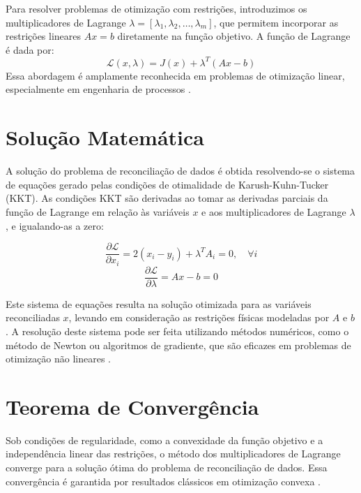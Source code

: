 \begin{definicao}
Para resolver problemas de otimização com restrições, introduzimos os multiplicadores de Lagrange $\lambda = [\lambda_1, \lambda_2, \dots, \lambda_m]$, que permitem incorporar as restrições lineares $Ax = b$ diretamente na função objetivo. A função de Lagrange é dada por:
\[
\mathcal{L}(x, \lambda) = J(x) + \lambda^T(Ax - b)
\]
Essa abordagem é amplamente reconhecida em problemas de otimização linear, especialmente em engenharia de processos \cite{lagrangerecon}.
\end{definicao}

\section{Solução Matemática}
\label{Sec:SolucaoMatematica}

A solução do problema de reconciliação de dados é obtida resolvendo-se o sistema de equações gerado pelas condições de otimalidade de Karush-Kuhn-Tucker (KKT). As condições KKT são derivadas ao tomar as derivadas parciais da função de Lagrange em relação às variáveis $x$ e aos multiplicadores de Lagrange $\lambda$, e igualando-as a zero:

\[
\frac{\partial \mathcal{L}}{\partial x_i} = 2(x_i - y_i) + \lambda^T A_i = 0, \quad \forall i
\]
\[
\frac{\partial \mathcal{L}}{\partial \lambda} = Ax - b = 0
\]

Este sistema de equações resulta na solução otimizada para as variáveis reconciliadas $x$, levando em consideração as restrições físicas modeladas por $A$ e $b$. A resolução deste sistema pode ser feita utilizando métodos numéricos, como o método de Newton ou algoritmos de gradiente, que são eficazes em problemas de otimização não lineares \cite{newtonreconciliation}.

\section{Teorema de Convergência}
\label{Sec:TeoremaConvergencia}

\begin{teorema}
Sob condições de regularidade, como a convexidade da função objetivo e a independência linear das restrições, o método dos multiplicadores de Lagrange converge para a solução ótima do problema de reconciliação de dados. Essa convergência é garantida por resultados clássicos em otimização convexa \cite{convexopt}.
\end{teorema}

